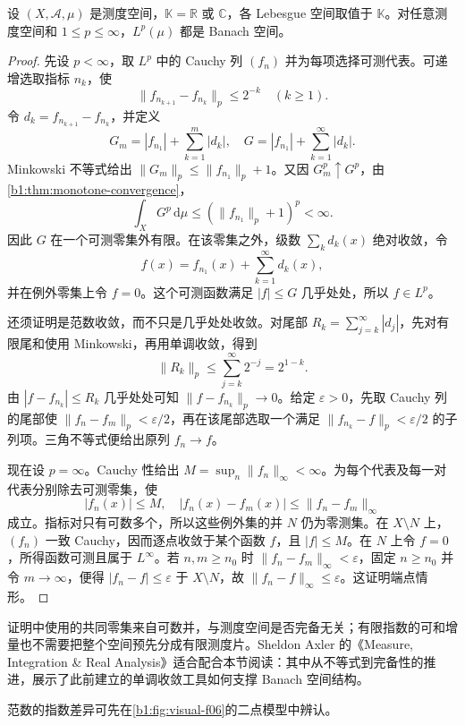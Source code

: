 \begin{theorem}\label{b1:thm:lp-complete}
设 \((X,\mathcal A,\mu)\) 是测度空间，\(\mathbb K=\mathbb R\) 或 \(\mathbb C\)，各 Lebesgue 空间取值于 \(\mathbb K\)。对任意测度空间和 \(1\leq p\leq\infty\)，\(L^p(\mu)\) 都是 Banach 空间。
\end{theorem}
\begin{proof}
先设 \(p<\infty\)，取 \(L^p\) 中的 Cauchy 列 \((f_n)\) 并为每项选择可测代表。可递增选取指标 \(n_k\)，使
\[
 \|f_{n_{k+1}}-f_{n_k}\|_p\leq2^{-k}\quad(k\geq1).
\]
令 \(d_k=f_{n_{k+1}}-f_{n_k}\)，并定义
\[
 G_m=|f_{n_1}|+\sum_{k=1}^m|d_k|,\quad
 G=|f_{n_1}|+\sum_{k=1}^{\infty}|d_k|.
\]
Minkowski 不等式给出 \(\|G_m\|_p\leq\|f_{n_1}\|_p+1\)。又因 \(G_m^p\uparrow G^p\)，由\cref{b1:thm:monotone-convergence}，
\[
 \int_XG^p\,\mathrm d\mu
 \leq(\|f_{n_1}\|_p+1)^p<\infty.
\]
因此 \(G\) 在一个可测零集外有限。在该零集之外，级数 \(\sum_kd_k(x)\) 绝对收敛，令
\[
 f(x)=f_{n_1}(x)+\sum_{k=1}^{\infty}d_k(x),
\]
并在例外零集上令 \(f=0\)。这个可测函数满足 \(|f|\leq G\) 几乎处处，所以 \(f\in L^p\)。

还须证明是范数收敛，而不只是几乎处处收敛。对尾部 \(R_k=\sum_{j=k}^{\infty}|d_j|\)，先对有限尾和使用 Minkowski，再用单调收敛，得到
\[
 \|R_k\|_p\leq\sum_{j=k}^{\infty}2^{-j}=2^{1-k}.
\]
由 \(|f-f_{n_k}|\leq R_k\) 几乎处处可知 \(\|f-f_{n_k}\|_p\to0\)。给定 \(\varepsilon>0\)，先取 Cauchy 列的尾部使 \(\|f_n-f_m\|_p<\varepsilon/2\)，再在该尾部选取一个满足 \(\|f_{n_k}-f\|_p<\varepsilon/2\) 的子列项。三角不等式便给出原列 \(f_n\to f\)。

现在设 \(p=\infty\)。Cauchy 性给出 \(M=\sup_n\|f_n\|_\infty<\infty\)。为每个代表及每一对代表分别除去可测零集，使
\[
 |f_n(x)|\leq M,\quad
 |f_n(x)-f_m(x)|\leq\|f_n-f_m\|_\infty
\]
成立。指标对只有可数多个，所以这些例外集的并 \(N\) 仍为零测集。在 \(X\setminus N\) 上，\((f_n)\) 一致 Cauchy，因而逐点收敛于某个函数 \(f\)，且 \(|f|\leq M\)。在 \(N\) 上令 \(f=0\)，所得函数可测且属于 \(L^\infty\)。若 \(n,m\geq n_0\) 时 \(\|f_n-f_m\|_\infty<\varepsilon\)，固定 \(n\geq n_0\) 并令 \(m\to\infty\)，便得 \(|f_n-f|\leq\varepsilon\) 于 \(X\setminus N\)，故 \(\|f_n-f\|_\infty\leq\varepsilon\)。这证明端点情形。
\end{proof}

证明中使用的共同零集来自可数并，与测度空间是否完备无关；有限指数的可和增量也不需要把整个空间预先分成有限测度片。Sheldon Axler 的《Measure, Integration \& Real Analysis》\cite[Sections 7A and 7B]{Axler2020Measure}适合配合本节阅读：其中从不等式到完备性的推进，展示了此前建立的单调收敛工具如何支撑 Banach 空间结构。

范数的指数差异可先在\cref{b1:fig:visual-f06}的二点模型中辨认。


